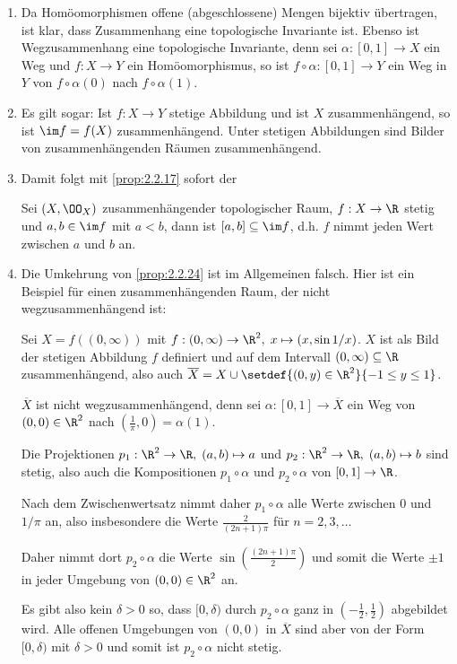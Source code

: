 \begin{bem}[Bemerkungen.]
\label{bem:2.2.25}
\begin{enumerate}[label=\arabic{*}.)]
  \item Da Homöomorphismen offene (abgeschlossene) Mengen bijektiv übertragen,
  ist klar, dass Zusammenhang eine topologische Invariante ist. Ebenso ist
  Wegzusammenhang eine topologische Invariante, denn sei $\alpha: [0,1]\to X$
  ein Weg und $f: X\to Y$ ein Homöomorphismus, so ist $f\circ\alpha: [0,1]\to
  Y$ ein Weg in $Y$ von $f\circ\alpha(0)$ nach $f\circ\alpha(1)$.
  \item Es gilt sogar: Ist $f: X\to Y$ stetige Abbildung und ist $X$
  zusammenhängend, so ist $\im f = f(X)$ zusammenhängend. Unter stetigen
  Abbildungen sind Bilder von zusammenhängenden Räumen zusammenhängend.
  \item Damit folgt mit \ref{prop:2.2.17} sofort der
  \begin{propn}[Zwischenwertsatz]
  Sei $(X,\OO_X)$ zusammenhängender topologischer Raum, $f:X\to\R$ stetig und
  $a,b\in\im f$ mit $a<b$, dann ist $[a,b]\subseteq \im f$, d.h. $f$ nimmt
  jeden Wert zwischen $a$ und $b$ an.\fishhere
  \end{propn}
  \item Die Umkehrung von \ref{prop:2.2.24} ist im Allgemeinen falsch. Hier ist
  ein Beispiel für einen zusammenhängenden Raum, der nicht wegzusammenhängend
  ist:
  
  Sei $X = f((0,\infty))$ mit $f:(0,\infty)\to\R^2,\;x\mapsto (x,\sin 1/x)$. $X$
  ist als Bild der stetigen Abbildung $f$ definiert und auf dem Intervall
  $(0,\infty)\subseteq \R$ zusammenhängend, also auch
  $\overline{X} = X\cup\setdef{(0,y)\in\R^2}{-1\le y\le 1}$.
  
  $\overline{X}$ ist nicht wegzusammenhängend, denn sei $\alpha: [0,1]\to
  \overline{X}$ ein Weg von $(0,0)\in\R^2$ nach $(\frac{1}{\pi},0) = \alpha(1)$.
  
  Die Projektionen $p_1: \R^2\to\R,\;(a,b)\mapsto a$ und
  $p_2:\R^2\to\R,\;(a,b)\mapsto b$ sind stetig, also auch die Kompositionen
  $p_1\circ\alpha$ und $p_2\circ\alpha$ von $[0,1]\to\R$.
  
  Nach dem Zwischenwertsatz nimmt daher $p_1\circ\alpha$ alle Werte zwischen
  $0$ und $1/\pi$ an, also insbesondere die Werte $\frac{2}{(2n+1)\pi}$ für
  $n=2,3,\ldots$
  
  Daher nimmt dort $p_2\circ\alpha$ die Werte
  $\sin\left(\frac{(2n+1)\pi}{2}\right)$ und somit die Werte $\pm 1$ in jeder
  Umgebung von $(0,0)\in\R^2$ an.
  
  Es gibt also kein $\delta > 0$ so, dass $[0,\delta)$ durch $p_2\circ\alpha$
  ganz in $(-\frac{1}{2},\frac{1}{2})$ abgebildet wird. Alle offenen Umgebungen
  von $(0,0)$ in $\overline{X}$ sind aber von der Form $[0,\delta)$ mit $\delta
  > 0$ und somit ist $p_2\circ\alpha$ nicht stetig.\dipper
\end{enumerate}
\end{bem}

